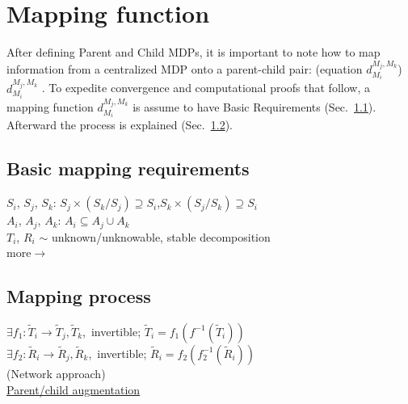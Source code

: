 \section{Mapping function}
\label{sec:mapping}

After defining Parent and Child MDPs, it is important to note how to map information from a centralized MDP onto a parent-child pair: (equation $d^{M_j, M_k}_{M_i}$) $d^{M_j, M_k}_{M_i}$ . To expedite convergence and computational proofs that follow, a mapping function $d^{M_j, M_k}_{M_i}$ is assume to have Basic Requirements (Sec.~\ref{sec:basicrequirements}). Afterward the process is explained (Sec.~\ref{sec:mappingprocess}).

\subsection{Basic mapping requirements}
\label{sec:basicrequirements}

$S_i$, $S_j$, $S_k$: \quad $S_j \times (S_k/S_j)  \supseteq S_i$,\quad $S_k \times (S_j/S_k) \supseteq S_i$\\

$A_i$, $A_j$, $A_k$: \quad $A_i \subseteq A_j\cup A_k$\\

$T_i$, $R_i$ $\sim$ unknown/unknowable, stable decomposition\\


more$\longrightarrow$
\\

\subsection{Mapping process}
\label{sec:mappingprocess}

$\exists f_1:\tilde{T}_i\to \tilde{T}_j, \tilde{T}_k$,\ invertible; $\tilde{T}_i = f_1\left(f^{-1}\left(\tilde{T}_i\right)\right)$\\
$\exists f_2:\tilde{R}_i\to \tilde{R}_j, \tilde{R}_k$,\ invertible; $\tilde{R}_i = f_2\left(f_2^{-1}\left(\tilde{R}_i\right)\right)$\\

(Network approach)\\
\underline{Parent/child augmentation}\\


